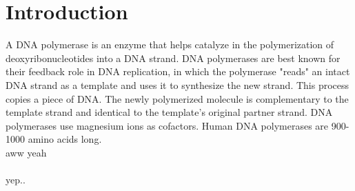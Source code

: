 \thispagestyle{plain}
\section{Introduction}
A DNA polymerase is an enzyme that helps catalyze in the polymerization of deoxyribonucleotides into a DNA strand. DNA polymerases are best known for their feedback role in DNA replication, in which the polymerase "reads" an intact DNA strand as a template and uses it to synthesize the new strand. This process copies a piece of DNA. The newly polymerized molecule is complementary to the template strand and identical to the template's original partner strand. DNA polymerases use magnesium ions as cofactors. Human DNA polymerases are 900-1000 amino acids long. \\

aww yeah\\
\ \\
yep..

